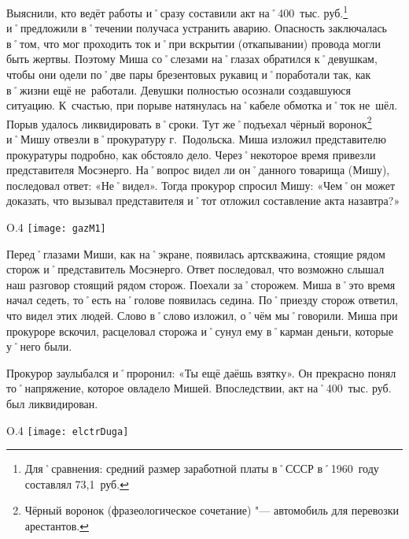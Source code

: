 Выяснили, кто ведёт работы и˚сразу составили акт на˚400~тыс. руб.\footnote{Для˚сравнения: средний размер заработной платы в˚СССР в˚1960~году составлял 73,1~руб.} и˚предложили в˚течении получаса устранить аварию. Опасность заключалась в˚том, что мог проходить ток и˚при вскрытии (откапывании) провода могли быть жертвы. Поэтому Миша со˚слезами на˚глазах обратился к˚девушкам, чтобы они одели по˚две пары брезентовых рукавиц и˚поработали так, как в˚жизни ещё не~работали. Девушки полностью осознали создавшуюся ситуацию. К~счастью, при порыве натянулась на˚кабеле обмотка и˚ток не~шёл. Порыв удалось ликвидировать в˚сроки. Тут же˚подъехал чёрный воронок\footnote{Чёрный воронок (фразеологическое сочетание) "--- автомобиль для перевозки арестантов.} и˚Мишу отвезли в˚прокуратуру г.~Подольска. Миша изложил представителю прокуратуры подробно, как обстояло дело. Через˚некоторое время привезли представителя Мосэнерго. На˚вопрос видел ли он˚данного товарища (Мишу), последовал ответ: «Не˚видел». Тогда прокурор спросил Мишу: «Чем˚он может доказать, что вызывал представителя и˚тот отложил составление акта назавтра?»

\begin{wrapfigure}{O}{.4\textwidth}
\centering
\texttt{[image: gazM1]}
\caption[Чёрный воронок. Автомобиль ГАЗ-М\=/1 в˚Музее отечественной военной истории.]{Чёрный воронок. Автомобиль ГАЗ-М\=/1 в˚Музее отечественной военной истории\footnotemark.}
\label{fig:gazM1}
\end{wrapfigure}

Перед˚глазами Миши, как на˚экране, появилась артскважина, стоящие рядом сторож и˚представитель Мосэнерго. Ответ последовал, что возможно слышал наш разговор стоящий рядом сторож. Поехали за˚сторожем. Миша в˚это время начал седеть, то˚есть на˚голове появилась седина. По˚приезду сторож ответил, что видел этих людей. Слово в˚слово изложил, о˚чём мы˚говорили. Миша при прокуроре вскочил, расцеловал сторожа и˚сунул ему в˚карман деньги, которые у˚него были.

Прокурор заулыбался и˚проронил: «Ты ещё даёшь взятку». Он прекрасно понял то˚напряжение, которое овладело Мишей. Впоследствии, акт на˚400~тыс. руб. был ликвидирован.

\begin{wrapfigure}{O}{.4\textwidth}
\centering
\texttt{[image: elctrDuga]}
\caption{Вольтова (электрическая) дуга.}
\label{fig:elctrDuga}
\end{wrapfigure}

